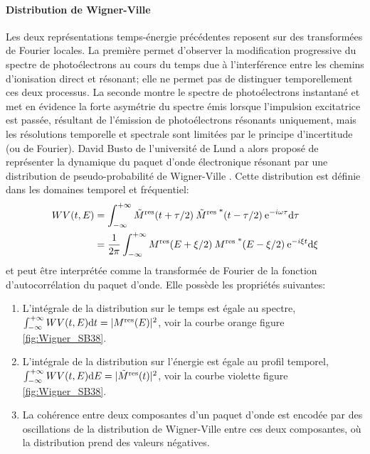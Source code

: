 \paragraph*{Distribution de Wigner-Ville} Les deux représentations temps-énergie précédentes reposent sur des transformées de Fourier locales. La première permet d'observer la modification progressive du spectre de photoélectrons au cours du temps due à l'interférence entre les chemins d'ionisation direct et résonant; elle ne permet pas de distinguer temporellement ces deux processus. La seconde montre le spectre de photoélectrons instantané et met en évidence la forte asymétrie du spectre émis lorsque l'impulsion excitatrice est passée, résultant de l'émission de photoélectrons résonants uniquement, mais les résolutions temporelle et spectrale sont limitées par le principe d'incertitude (ou de Fourier). David Busto de l'université de Lund a alors proposé de représenter la dynamique du paquet d'onde électronique résonant par une distribution de pseudo-probabilité de Wigner-Ville . Cette distribution est définie dans les domaines temporel et fréquentiel: 
\begin{align}
WV(t, E) & = \int_{-\infty}^{+\infty} \tilde{M}^{\text{res}}(t + \tau/2) \: \tilde{M}^{\text{res *}}(t - \tau/2) \: \mathrm{e}^{- i\omega \tau} \mathrm{d} \tau \\ & = \frac{1}{2\pi} \int_{-\infty}^{+\infty} M^{\text{res}}(E + \xi/2) \: M^{\text{res *}}(E - \xi/2) \: \mathrm{e}^{- i\xi t} \mathrm{d} \xi
\end{align}
et peut être interprétée comme la transformée de Fourier de la fonction d'autocorrélation du paquet d'onde. Elle possède les propriétés suivantes:
\begin{enumerate}
\item L'intégrale de la distribution sur le temps est égale au spectre, $\int_{-\infty}^{+\infty} WV(t, E) \mathrm{d} t = |M^{\text{res}}(E)|^2$, voir la courbe orange figure \ref{fig:Wigner_SB38}.
\item L'intégrale de la distribution sur l'énergie est égale au profil temporel, $\int_{-\infty}^{+\infty} WV(t, E) \mathrm{d} E = |\tilde{M}^{\text{res}}(t)|^2$, voir la courbe violette figure \ref{fig:Wigner_SB38}. 
\item La cohérence entre deux composantes d'un paquet d'onde est encodée par des oscillations de la distribution de Wigner-Ville entre ces deux composantes, où la distribution prend des valeurs négatives.
\end{enumerate}

